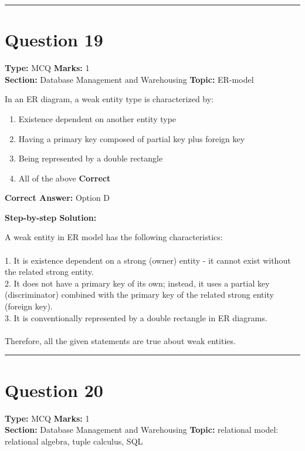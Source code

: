 \documentclass[11pt]{article}
\begin{document}
\vspace{0.8em}
\hrule
\vspace{0.4em}
\section*{Question 19}
\textbf{Type:} MCQ \hfill \textbf{Marks:} 1\\
\textbf{Section:} Database Management and Warehousing \hfill \textbf{Topic:} ER-model

In an ER diagram, a weak entity type is characterized by:


\begin{enumerate}[label=\textbf{\Alph*.}, leftmargin=1.8em]
\item Existence dependent on another entity type\item Having a primary key composed of partial key plus foreign key\item Being represented by a double rectangle\item All of the above \hfill {\color{gategreen}\textbf{Correct}}\end{enumerate}

\textbf{Correct Answer:} Option D

\textbf{Step-by-step Solution:}

A weak entity in ER model has the following characteristics:\\
\\
1. It is existence dependent on a strong (owner) entity - it cannot exist without the related strong entity.\\
2. It does not have a primary key of its own; instead, it uses a partial key (discriminator) combined with the primary key of the related strong entity (foreign key).\\
3. It is conventionally represented by a double rectangle in ER diagrams.\\
\\
Therefore, all the given statements are true about weak entities.

\vspace{0.8em}
\hrule
\vspace{0.4em}
\section*{Question 20}
\textbf{Type:} MCQ \hfill \textbf{Marks:} 1\\
\textbf{Section:} Database Management and Warehousing \hfill \textbf{Topic:} relational model: relational algebra, tuple calculus, SQL
\end{document}
